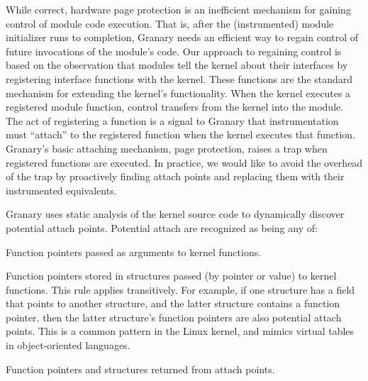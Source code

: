 \documentclass[preprint]{sigplanconf}
\newenvironment{enumerate*}%
  {\begin{enumerate}%
    \setlength{\itemsep}{2pt}%
    \setlength{\parskip}{0pt}}%
  {\end{enumerate}}
\begin{document}

While correct, hardware page protection is an inefficient mechanism for gaining control of module code execution. That is, after the (instrumented) module initializer runs to completion, Granary needs an efficient way to regain control of future invocations of the module's code. Our approach to regaining control is based on the observation that modules tell the kernel about their interfaces by registering interface functions with the kernel. These functions are the standard mechanism for extending the kernel's functionality. When the kernel executes a registered module function, control transfers from the kernel into the module. The act of registering a function is a signal to Granary that instrumentation must ``attach'' to the registered function when the kernel executes that function. Granary's basic attaching mechanism, page protection, raises a trap when registered functions are executed. In practice, we would like to avoid the overhead of the trap by proactively finding attach points and replacing them with their instrumented equivalents.



Granary uses static analysis of the kernel source code to dynamically discover potential attach points. Potential attach are recognized as being any of: \begin{enumerate*}
	\item Function pointers passed as arguments to kernel functions.
	\item Function pointers stored in structures passed (by pointer or value) to kernel functions. This rule applies transitively. For example, if one structure has a field that points to another structure, and the latter structure contains a function pointer, then the latter structure's function pointers are also potential attach points. This is a common pattern in the Linux kernel, and mimics virtual tables in object-oriented languages.
	\item Function pointers and structures returned from attach points.
\end{enumerate*}
\end{document}
